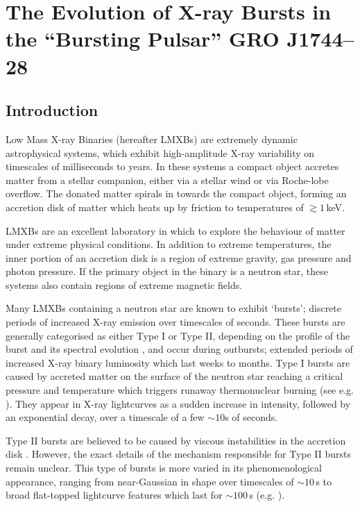 
\chapter{The Evolution of X-ray Bursts in the ``Bursting Pulsar'' GRO J1744--28}


\section{Introduction}

\par Low Mass X-ray Binaries (hereafter LMXBs) are extremely dynamic astrophysical systems, which exhibit high-amplitude X-ray variability on timescales of milliseconds to years.  In these systems a compact object accretes matter from a stellar companion, either via a stellar wind or via Roche-lobe overflow.  The donated matter spirals in towards the compact object, forming an accretion disk of matter which heats up by friction to temperatures of $\gtrsim1$\,keV.
\par LMXBs are an excellent laboratory in which to explore the behaviour of matter under extreme physical conditions.  In addition to extreme temperatures, the inner portion of an accretion disk is a region of extreme gravity, gas pressure and photon pressure.  If the primary object in the binary is a neutron star, these systems also contain regions of extreme magnetic fields.
\par Many LMXBs containing a neutron star are known to exhibit `bursts'; discrete periods of increased X-ray emission over timescales of seconds.  These bursts are generally categorised as either Type I or Type II, depending on the profile of the burst and its spectral evolution \citep{Hoffman_RB,Lewin_Bursts}, and occur during outbursts; extended periods of increased X-ray binary luminosity which last weeks to months.  Type I bursts are caused by accreted matter on the surface of the neutron star reaching a critical pressure and temperature which triggers runaway thermonuclear burning (see e.g. \citealp{Lewin_Bursts,Strohmayer_TypeI}).  They appear in X-ray lightcurves as a sudden increase in intensity, followed by an exponential decay, over a timescale of a few $\sim10$s of seconds.
\par Type II bursts are believed to be caused by viscous instabilities in the accretion disk \citep{Lewin_TypeII}.  However, the exact details of the mechanism responsible for Type II bursts remain unclear.  This type of bursts is more varied in its phenomenological appearance, ranging from near-Gaussian in shape over timescales of $\sim10$\,s to broad flat-topped lightcurve features which last for $\sim100$\,s (e.g. \citealp{Bagnoli_PopStudy}).
